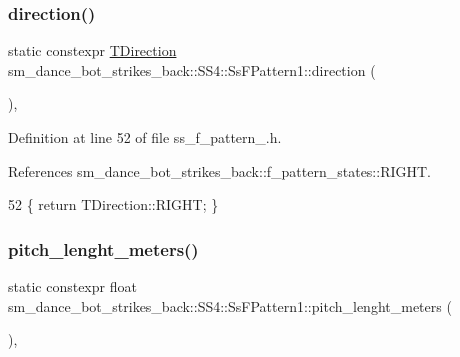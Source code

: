 \subsubsection{\texorpdfstring{direction()}{direction()}}
{\footnotesize\ttfamily static constexpr \hyperlink{namespacesm__dance__bot__strikes__back_1_1f__pattern__states_a606b9ab33830b5491413ff90dc1ea1ac}{T\+Direction} sm\+\_\+dance\+\_\+bot\+\_\+strikes\+\_\+back\+::\+S\+S4\+::\+Ss\+F\+Pattern1\+::direction (\begin{DoxyParamCaption}{ }\end{DoxyParamCaption})\hspace{0.3cm}{\ttfamily [inline]}, {\ttfamily [static]}}



Definition at line 52 of file ss\+\_\+f\+\_\+pattern\+\_.\+h.



References sm\+\_\+dance\+\_\+bot\+\_\+strikes\+\_\+back\+::f\+\_\+pattern\+\_\+states\+::\+R\+I\+G\+HT.


\begin{DoxyCode}
52 \{ \textcolor{keywordflow}{return} TDirection::RIGHT; \}
\end{DoxyCode}
\mbox{\label{structsm__dance__bot__strikes__back_1_1SS4_1_1SsFPattern1_ab98454c837f0c7f01ab14ac30bce718e}} 
\subsubsection{\texorpdfstring{pitch\+\_\+lenght\+\_\+meters()}{pitch\_lenght\_meters()}}
{\footnotesize\ttfamily static constexpr float sm\+\_\+dance\+\_\+bot\+\_\+strikes\+\_\+back\+::\+S\+S4\+::\+Ss\+F\+Pattern1\+::pitch\+\_\+lenght\+\_\+meters (\begin{DoxyParamCaption}{ }\end{DoxyParamCaption})\hspace{0.3cm}{\ttfamily [inline]}, {\ttfamily [static]}}



